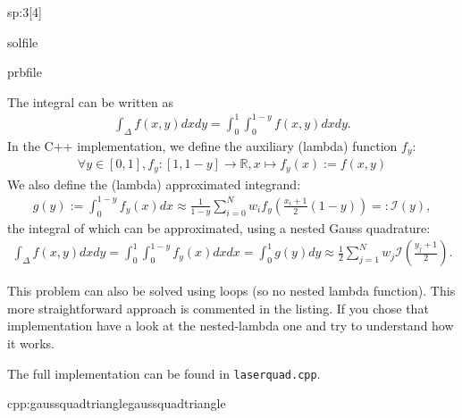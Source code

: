\begin{samproblem}
\begin{subproblem}{sp:3}[4]
  
  \begin{samwriteprbpart}{solfile}
    \begin{writeverbatim}{prbfile}
      \begin{samsolution}
        The integral can be written as
        \begin{align*}
          \int_\Delta f(x,y) dx dy = \int_0^1 \int_0^{1-y} f(x,y) dx dy.
        \end{align*}
        In the C++ implementation, we define the auxiliary (lambda) function $f_y$:
        \begin{align*}
          \forall y \in [0,1], f_y: [1,1-y] \rightarrow \mathbb{R}, x \mapsto f_y(x) := f(x,y)
        \end{align*}
        We also define the (lambda) approximated integrand:
        \begin{align}
          g(y) := \int_0^{1-y} f_y(x) dx \approx \frac{1}{1-y} \sum_{i = 0}^N w_i f_y\left(\frac{x_i + 1}{2}  (1-y)\right) =: \mathcal{I}(y),
        \end{align}
        the integral of which can be approximated, using a nested Gauss quadrature:
        \begin{align}
          \int_\Delta f(x,y) dx dy  = \int_0^1  \int_0^{1-y} f_y(x) dx dx = \int_0^1 g(y) dy \approx \frac{1}{2} \sum_{j = 1}^N w_j \mathcal{I}\left(\frac{y_j + 1}{2}\right).
        \end{align}

        This problem can also be solved using loops (so no nested lambda function).
        This more straightforward approach is commented in the listing.
        If you chose that implementation have a look at the nested-lambda one and try to understand how it works.

        The full implementation can be found in \verb|laserquad.cpp|.

        \begin{samcode}[C++-code]{cpp:gaussquadtriangle}{gaussquadtriangle}
          \small
        \end{samcode}
      \end{samsolution}
    \end{writeverbatim}
  \end{samwriteprbpart}

\end{subproblem}


\end{samproblem}
